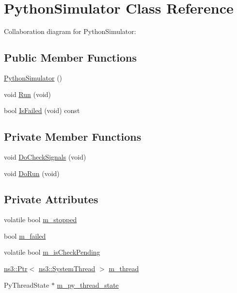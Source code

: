 \hypertarget{classPythonSimulator}{}\section{Python\+Simulator Class Reference}
\label{classPythonSimulator}


Collaboration diagram for Python\+Simulator\+:
\subsection*{Public Member Functions}
\begin{DoxyCompactItemize}
\item 
\hyperlink{classPythonSimulator_a7c04e338051fbb19d4da8848c743761b}{Python\+Simulator} ()
\item 
void \hyperlink{classPythonSimulator_ab712f4079b2b054f2ddc2ba57d840c18}{Run} (void)
\item 
bool \hyperlink{classPythonSimulator_ab75c34c0ffac31d9677fd7853fbf248c}{Is\+Failed} (void) const 
\end{DoxyCompactItemize}
\subsection*{Private Member Functions}
\begin{DoxyCompactItemize}
\item 
void \hyperlink{classPythonSimulator_ae490c91afff98be992a5b45ee216ce4a}{Do\+Check\+Signals} (void)
\item 
void \hyperlink{classPythonSimulator_a8fdd25c4b44834b32b9955f52d26d35b}{Do\+Run} (void)
\end{DoxyCompactItemize}
\subsection*{Private Attributes}
\begin{DoxyCompactItemize}
\item 
volatile bool \hyperlink{classPythonSimulator_a1f51fb844d75b932e6bb13af9889501e}{m\+\_\+stopped}
\item 
bool \hyperlink{classPythonSimulator_a85d760df5c63546c6dcd4f563af64440}{m\+\_\+failed}
\item 
volatile bool \hyperlink{classPythonSimulator_a39dd069b57b7646e9ce951796b845c49}{m\+\_\+is\+Check\+Pending}
\item 
\hyperlink{classns3_1_1Ptr}{ns3\+::\+Ptr}$<$ \hyperlink{classns3_1_1SystemThread}{ns3\+::\+System\+Thread} $>$ \hyperlink{classPythonSimulator_a142a11a2e7d6de41507bad5622265d7e}{m\+\_\+thread}
\item 
Py\+Thread\+State $\ast$ \hyperlink{classPythonSimulator_a8753254ac25b9e483f20b237d4b3b85c}{m\+\_\+py\+\_\+thread\+\_\+state}
\end{DoxyCompactItemize}



